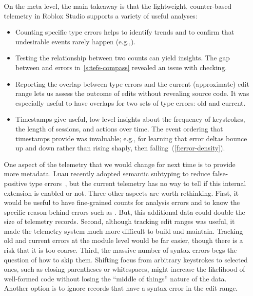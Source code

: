 \documentclass[english,submission,cleveref]{programming}
\begin{document}
On the meta level, the main takeaway is that the lightweight, counter-based telemetry
in Roblox Studio supports a variety of useful analyses:
\begin{itemize}
  \item
    Counting specific type errors helps to identify trends and to confirm that
    undesirable events rarely happen (e.g.,).
  \item
    Testing the relationship between two counts can yield insights.
    The gap between \mstrict{} and \FS{} errors in~\cref{s:tefs-compass}
    revealed an issue with \mstrict{} checking.
  \item
    Reporting the overlap between type errors and the current (approximate) edit
    range lets us assess the outcome of edits without revealing source code.
    It was especially useful to have overlaps for two sets of type errors: old and current.
  \item
    Timestamps give useful, low-level insights about the frequency of keystrokes,
    the length of sessions, and actions over time.
    The event ordering that timestamps provide was invaluable; e.g., for learning
    that error deltas bounce up and down rather than rising shaply, then falling~(\cref{f:error-density}).
\end{itemize}

One aspect of the telemetry that we would change for next time is to provide
more metadata.
Luau recently adopted semantic subtyping to reduce false-positive type
errors~\cite{CF05:GentleIntroduction,Jef22:SemanticSubtyping}, but the current
telemetry has no way to tell if this
internal extension is enabled or not.
Three other aspects are worth rethinking.
First, it would be useful to have fine-grained counts for \FS{} analysis
errors and to know the specific reason behind errors such as .
But, this additional data could double the size of telemetry records.
Second, although tracking edit ranges was useful, it made the telemetry system
much more difficult to build and maintain.
Tracking old and current errors at the module level would be far easier,
though there is a risk that it is too coarse.
Third, the massive number of syntax errors begs the question of how to skip
them.
Shifting focus from arbitrary keystrokes to selected ones, such as closing
parentheses or whitespaces, might increase the likelihood of well-formed
code without losing the ``middle of things'' nature of the data.
Another option is to ignore records that have a syntax error in the edit range.
\end{document}
